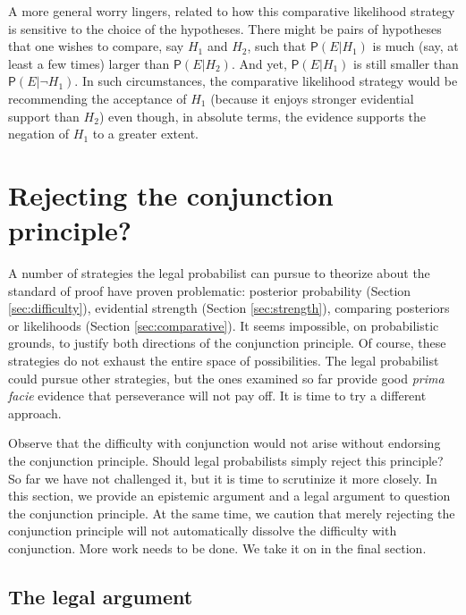 \documentclass[
  10pt,
  dvipsnames,enabledeprecatedfontcommands]{scrartcl}
\newcommand{\n}{\neg}
\newcommand{\pr}[1]{\ensuremath{\mathsf{P}(#1)}}
\begin{document}
A more general worry lingers, related to how this comparative likelihood
strategy is sensitive to the choice of the hypotheses. There might be
pairs of hypotheses that one wishes to compare, say \(H_1\) and \(H_2\),
such that \(\pr{E\vert H_1}\) is much (say, at least a few times) larger
than \(\pr{E\vert H_2}\). And yet, \(\pr{E \vert H_1}\) is still smaller
than \(\pr{E \vert \n H_1}\). In such circumstances, the comparative
likelihood strategy would be recommending the acceptance of \(H_1\)
(because it enjoys stronger evidential support than \(H_2\)) even
though, in absolute terms, the evidence supports the negation of \(H_1\)
to a greater extent.

\hypertarget{rejecting-the-conjunction-principle}{%
\section{Rejecting the conjunction
principle?}\label{rejecting-the-conjunction-principle}}

\label{sec:reject}

A number of strategies the legal probabilist can pursue to theorize
about the standard of proof have proven problematic: posterior
probability (Section \ref{sec:difficulty}), evidential strength (Section
\ref{sec:strength}), comparing posteriors or likelihoods (Section
\ref{sec:comparative}). It seems impossible, on probabilistic grounds,
to justify both directions of the conjunction principle. Of course,
these strategies do not exhaust the entire space of possibilities. The
legal probabilist could pursue other strategies, but the ones examined
so far provide good \textit{prima facie} evidence that perseverance will
not pay off. It is time to try a different approach.

Observe that the difficulty with conjunction would not arise without
endorsing the conjunction principle. Should legal probabilists simply
reject this principle? So far we have not challenged it, but it is time
to scrutinize it more closely. In this section, we provide an epistemic
argument and a legal argument to question the conjunction principle. At
the same time, we caution that merely rejecting the conjunction
principle will not automatically dissolve the difficulty with
conjunction. More work needs to be done. We take it on in the final
section.

\hypertarget{the-legal-argument}{%
\subsection{The legal argument}\label{the-legal-argument}}
\end{document}
